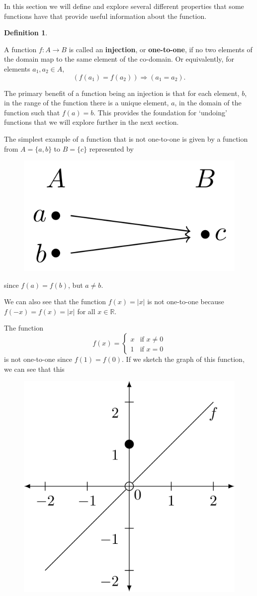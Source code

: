 \documentclass[
]{book}
\theoremstyle{definition}
\newtheorem{definition}{Definition}[chapter]
\theoremstyle{definition}
\theoremstyle{definition}
\theoremstyle{definition}
\theoremstyle{remark}
\begin{document}
In this section we will define and explore several different properties that some functions have that provide useful information about the function.

\begin{definition}
\protect\hypertarget{def:unlabeled-div-62}{}\label{def:unlabeled-div-62}

A function \(f:A\rightarrow B\) is called an \textbf{injection}, or \textbf{one-to-one}, if no two elements of the domain map to the same element of the co-domain. Or equivalently, for elements \(a_1,a_2 \in A\), \[\left(f(a_1)=f(a_2)\right) \Rightarrow \left(a_1=a_2\right).\]

\end{definition}

The primary benefit of a function being an injection is that for each element, \(b\), in the range of the function there is a unique element, \(a\), in the domain of the function such that \(f(a)=b\). This provides the foundation for `undoing' functions that we will explore further in the next section.

The simplest example of a function that is not one-to-one is given by a function from \(A=\{a,b\}\) to \(B=\{c\}\) represented by

\begin{figure}
 
 {\centering \includegraphics[width=0.3\linewidth]{tikz/example-noninjection} 
 
 }
 
 \end{figure}

since \(f(a)=f(b)\), but \(a\neq b\).

We can also see that the function \(f(x)=|x|\) is not one-to-one because \(f(-x)=f(x)=|x|\) for all \(x\in \mathbb{R}\).

The function
\[f(x)=\begin{cases} x & \mbox{if } x\neq 0 \\
1 & \mbox{if } x=0
\end{cases}\]
is not one-to-one since \(f(1)=f(0)\). If we sketch the graph of this function, we can see that this

\begin{figure}
 
 {\centering \includegraphics[width=0.3\linewidth]{tikz/example2-noninjection} 
 
 }
 
 \end{figure}
\end{document}
